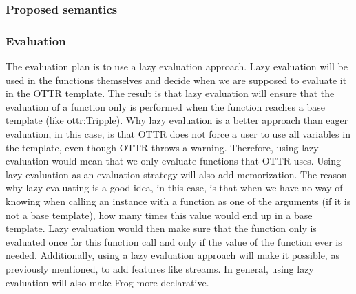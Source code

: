 \subsubsection{Proposed semantics}

\subsubsection{Evaluation}
The evaluation plan is to use a lazy evaluation approach. Lazy evaluation will be used in the functions themselves and decide when we are supposed to evaluate it in the OTTR template. The result is that lazy evaluation will ensure that the evaluation of a function only is performed when the function reaches a base template (like ottr:Tripple). Why lazy evaluation is a better approach than eager evaluation, in this case, is that OTTR does not force a user to use all variables in the template, even though OTTR throws a warning. Therefore, using lazy evaluation would mean that we only evaluate functions that OTTR uses. Using lazy evaluation as an evaluation strategy will also add memorization. The reason why lazy evaluating is a good idea, in this case, is that when we have no way of knowing when calling an instance with a function as one of the arguments (if it is not a base template), how many times this value would end up in a base template. Lazy evaluation would then make sure that the function only is evaluated once for this function call and only if the value of the function ever is needed. Additionally, using a lazy evaluation approach will make it possible, as previously mentioned, to add features like streams. In general, using lazy evaluation will also make Frog more declarative.  

